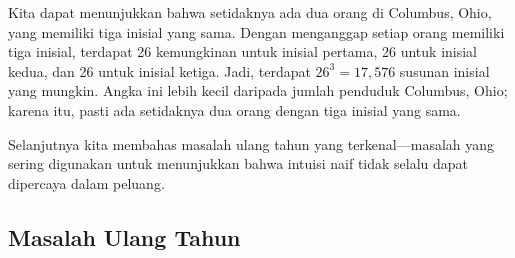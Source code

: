 \begin{example}\label{exam 3.2} Kita dapat menunjukkan bahwa setidaknya ada dua orang di
Columbus, Ohio, yang memiliki tiga inisial yang sama.  Dengan menganggap setiap orang
memiliki tiga inisial, terdapat 26 kemungkinan untuk inisial pertama, 26 untuk inisial
kedua, dan 26 untuk inisial ketiga.  Jadi, terdapat $26^3 = 17{,}576$ susunan inisial
yang mungkin.  Angka ini lebih kecil daripada jumlah penduduk Columbus, Ohio; karena
itu, pasti ada setidaknya dua orang dengan tiga inisial yang sama.
\end{example}

Selanjutnya kita membahas masalah ulang tahun yang terkenal---masalah yang sering
digunakan untuk menunjukkan bahwa intuisi naif tidak selalu dapat dipercaya dalam
peluang.

\subsection*{Masalah Ulang Tahun}

